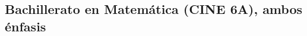 \documentclass[11pt,a4paper]{article}
\begin{document}
\begingroup
\newcommand{\qe}[2]{\par\textbf{#1:} ``#2''}
\newcommand{\cur}[1]{\par\textit{Cursos:} #1}
\newcommand{\nt}[1]{\par\textit{Nota:} #1}
\newcommand{\mrow}[3]{#1 & #2 & #3 \\ \hline}
\newcommand{\mcesca}[2]{%
  \begingroup
  \footnotesize
  \setlength{\tabcolsep}{4pt}%
  \setlength{\parskip}{2pt}%
  \arrayrulecolor{Azul-UCR!80}%
  \renewcommand{\arraystretch}{1.2}%
  \rowcolors{2}{white}{Celeste-UCR!12}%
  \begin{longtable}{|>{\raggedright\arraybackslash}p{2.2cm}|>{\raggedright\arraybackslash}p{5.1cm}|>{\raggedright\arraybackslash}p{8.4cm}|}
  \caption{#1}\label{#2}\\
  \hline
  \rowcolor{Azul-UCR}
  \textcolor{white}{\textbf{Descriptor}} & \textcolor{white}{\textbf{Resultado MCESCA}} & \textcolor{white}{\textbf{Documento plan de estudios}} \\ \hline
  \endfirsthead
  \hline
  \rowcolor{Azul-UCR}
  \textcolor{white}{\textbf{Descriptor}} & \textcolor{white}{\textbf{Resultado MCESCA}} & \textcolor{white}{\textbf{Documento plan de estudios}} \\ \hline
  \endhead
  \hline
  \endfoot
}
\newcommand{\finmcesca}{\end{longtable}\endgroup}

\subsection*{Bachillerato en Matemática (CINE 6A), ambos énfasis}
\end{document}
